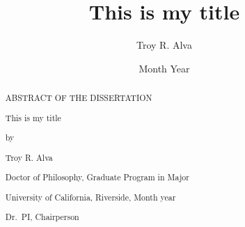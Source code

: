 \documentclass[12pt,oneside]{ucrthesis}
\title{This is my title}
\author{Troy R. Alva}
\date{Month Year}
\begin{document}
\maketitle

\frontmatter
\begin{acknowledgements}
  \lipsum
\end{acknowledgements}
\begin{dedication}
  \begin{center}
    \null\vfil
    \lipsum
    \null\vfil
  \end{center}
\end{dedication}
\begin{abstract}
  \begin{center}
  \begin{singlespace}
    ABSTRACT OF THE \expandafter\uppercase\expandafter{Dissertation}\par
    \vspace{.5in}
    This is my title\par
    \vspace{.25in}
    by\par
    \vspace{.25in}
    Troy R. Alva\par
    \vspace{.25in}
    Doctor of Philosophy, Graduate Program in Major\par
    University of California, Riverside, Month year\par
    Dr.~PI, Chairperson\par
    \vspace{.25in}
  \end{singlespace}
  \end{center}
      \lipsum
\end{abstract}

\hypersetup{linkcolor=black}
\setcounter{secnumdepth}{2}
\setcounter{tocdepth}{2}

\tableofcontents

\cleardoublepage
{}
\listoffigures

\cleardoublepage
{}
\listoftables


\mainmatter %
\pagestyle{fancyplain} %
\end{document}
